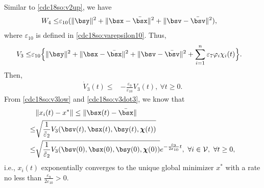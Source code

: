 \documentclass[letterpaper, 10 pt, conference]{ieeeconf}  %
\begin{document}
Similar to \eqref{cdc18so:v2up}, we have
\begin{align*}%
W_4
\le&\varepsilon_{10}(\|\bsy\|^2+\|\bsx-\bar{\bsx}\|^2+\|\bsv-\bar{\bsv}\|^2),
\end{align*}
where $\varepsilon_{10}$ is defined in \eqref{cdc18so:varepsilon10}.
Thus,
\begin{align*}%
V_3
\le&\varepsilon_{10}\Big\{\|\bsy\|^2+\|\bsx-\bar{\bsx}\|^2+\|\bsv-\bar{\bsv}\|^2
+\sum_{i=1}^n\varepsilon_{7}\varphi_i\chi_i(t)\Big\}.
\end{align*}
Then,
\begin{align}\label{cdc18so:v3dot3}
\dot{V}_3(t)\le& -\frac{\varepsilon_9}{\varepsilon_{10}}V_3(t),~\forall t\ge0.
\end{align}
From \eqref{cdc18so:v3low} and \eqref{cdc18so:v3dot3},
we know that
\begin{align*}
&\|x_i(t)-x^*\|\le\|\bsx(t)-\bar{\bsx}\|\\
\le&\sqrt{\frac{1}
{\tilde{\varepsilon}_2}V_3(\bsv(t),\bsx(t),\bsy(t),{\boldsymbol{\chi}}(t))}\\
\le&\sqrt{\frac{1}
{\tilde{\varepsilon}_2}V_3(\bsv(0),\bsx(0),\bsy(0),{\boldsymbol{\chi}}(0))}
e^{-\frac{\varepsilon_9}{2\varepsilon_{10}}t},~\forall i\in\mathcal V,~\forall t\ge0,
\end{align*}
i.e., $x_i(t)$ exponentially converges to the unique global minimizer $x^*$ with a rate no less than $\frac{\varepsilon_9}{2\varepsilon_{10}}>0$.
\end{document}
